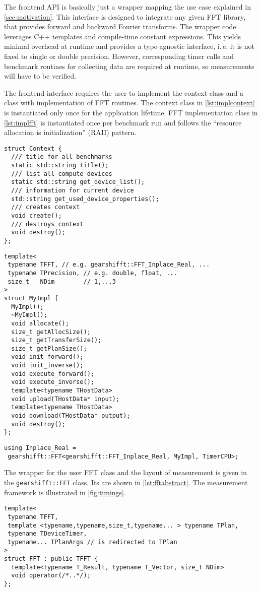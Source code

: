 The frontend API is basically just a wrapper mapping the use case explained in \cref{sec:motivation}.
This interface is designed to integrate any given FFT library, that provides forward and backward Fourier transforms.
The wrapper code leverages C++ templates and compile-time constant expressions.
This yields minimal overhead at runtime and provides a type-agnostic interface, i.\,e. it is not fixed to single or double precision.
However, corresponding timer calls and benchmark routines for collecting data are required at runtime, so measurements will have to be verified.

The frontend interface requires the user to implement the context class and a class with implementation of FFT routines.
The context class in \cref{lst:implcontext} is instantiated only once for the application lifetime.
FFT implementation class in \cref{lst:implfft} is instantiated once per benchmark run and follows the ``resource allocation is initialization'' (RAII) pattern.


\begin{lstlisting}[caption={Context class required by gearshifft API},label={lst:implcontext}]
struct Context {
  /// title for all benchmarks
  static std::string title();
  /// list all compute devices
  static std::string get_device_list();
  /// information for current device
  std::string get_used_device_properties();
  /// creates context
  void create();
  /// destroys context
  void destroy();
};
\end{lstlisting}
\begin{lstlisting}[caption={FFT class required by gearshifft API},label={lst:implfft}]
template<
 typename TFFT, // e.g. gearshifft::FFT_Inplace_Real, ...
 typename TPrecision, // e.g. double, float, ...
 size_t   NDim        // 1,..,3
>
struct MyImpl {
  MyImpl();
  ~MyImpl();
  void allocate();
  size_t getAllocSize();
  size_t getTransferSize();
  size_t getPlanSize();
  void init_forward();
  void init_inverse();
  void execute_forward();
  void execute_inverse();
  template<typename THostData>
  void upload(THostData* input);
  template<typename THostData>
  void download(THostData* output);
  void destroy();
};
\end{lstlisting}
\begin{lstlisting}[caption={Using FFT class},label={lst:implfftusing}]
using Inplace_Real =
 gearshifft::FFT<gearshifft::FFT_Inplace_Real, MyImpl, TimerCPU>;
\end{lstlisting}

The wrapper for the user FFT class and the layout of measurement is given in the \lstinline!gearshifft::FFT! class.
Its are shown in \cref{lst:fftabstract}. The measurement framework is illustrated in \cref{fig:timings}.
\begin{lstlisting}[caption={FFT wrapper class},label={lst:fftabstract}]
template<
 typename TFFT,
 template <typename,typename,size_t,typename... > typename TPlan,
 typename TDeviceTimer,
 typename... TPlanArgs // is redirected to TPlan
>
struct FFT : public TFFT {
  template<typename T_Result, typename T_Vector, size_t NDim>
  void operator(/*..*/);
};
\end{lstlisting}

